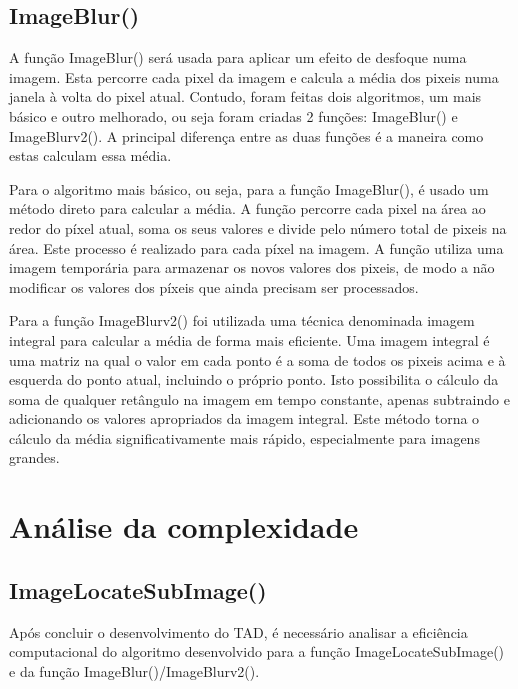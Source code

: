 \documentclass{article}
\begin{document}
\subsection{ImageBlur()}

A função ImageBlur() será usada para aplicar um efeito de desfoque numa imagem.
Esta percorre cada pixel da imagem e calcula a média dos pixeis numa janela à volta do pixel atual.
Contudo, foram feitas dois algoritmos, um mais básico e outro melhorado, ou seja foram criadas 2 funções:
ImageBlur() e ImageBlurv2(). A principal diferença entre as duas funções é a maneira como estas calculam essa média.

Para o algoritmo mais básico, ou seja, para a função ImageBlur(), é usado um método direto para calcular a média.
A função percorre cada pixel na área ao redor do píxel atual, soma os seus valores e divide pelo número total de pixeis na área. 
Este processo é realizado para cada píxel na imagem. A função utiliza uma imagem temporária para
 armazenar os novos valores dos pixeis, de modo a não modificar os valores dos píxeis que ainda 
 precisam ser processados.


Para a função ImageBlurv2() foi utilizada uma técnica denominada imagem integral para calcular a média de 
 forma mais eficiente. Uma imagem integral é uma matriz na qual o valor em cada ponto é a soma de 
 todos os pixeis acima e à esquerda do ponto atual, incluindo o próprio ponto. Isto possibilita o 
 cálculo da soma de qualquer retângulo na imagem em tempo constante, apenas subtraindo e adicionando 
 os valores apropriados da imagem integral. Este método torna o cálculo da média significativamente mais
  rápido, especialmente para imagens grandes.












\section{Análise da complexidade}
\subsection{ImageLocateSubImage()}





Após concluir o desenvolvimento do TAD, é necessário analisar a eficiência computacional do
algoritmo desenvolvido para a função ImageLocateSubImage() e da função ImageBlur()/ImageBlurv2().
\end{document}
